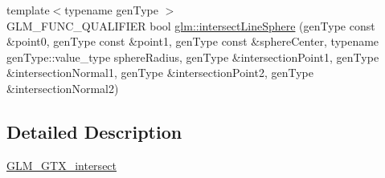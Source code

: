 \begin{DoxyCompactItemize}
\item 
{\footnotesize template$<$typename gen\+Type $>$ }\\G\+L\+M\+\_\+\+F\+U\+N\+C\+\_\+\+Q\+U\+A\+L\+I\+F\+I\+ER bool \hyperlink{group__gtx__intersect_ga9c68139f3d8a4f3d7fe45f9dbc0de5b7}{glm\+::intersect\+Line\+Sphere} (gen\+Type const \&point0, gen\+Type const \&point1, gen\+Type const \&sphere\+Center, typename gen\+Type\+::value\+\_\+type sphere\+Radius, gen\+Type \&intersection\+Point1, gen\+Type \&intersection\+Normal1, gen\+Type \&intersection\+Point2, gen\+Type \&intersection\+Normal2)
\end{DoxyCompactItemize}


\subsection{Detailed Description}
\hyperlink{group__gtx__intersect}{G\+L\+M\+\_\+\+G\+T\+X\+\_\+intersect} 